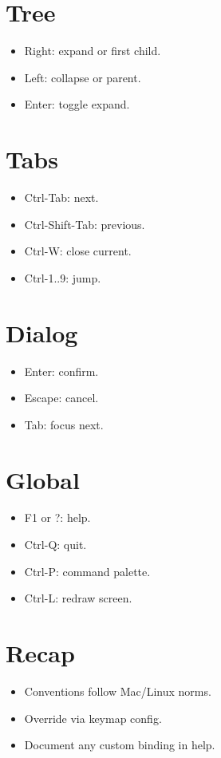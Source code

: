 \section{Tree}

\begin{itemize}[leftmargin=*]
  \item Right: expand or first child.
  \item Left: collapse or parent.
  \item Enter: toggle expand.
\end{itemize}

\section{Tabs}

\begin{itemize}[leftmargin=*]
  \item Ctrl-Tab: next.
  \item Ctrl-Shift-Tab: previous.
  \item Ctrl-W: close current.
  \item Ctrl-1..9: jump.
\end{itemize}

\section{Dialog}

\begin{itemize}[leftmargin=*]
  \item Enter: confirm.
  \item Escape: cancel.
  \item Tab: focus next.
\end{itemize}

\section{Global}

\begin{itemize}[leftmargin=*]
  \item F1 or ?: help.
  \item Ctrl-Q: quit.
  \item Ctrl-P: command palette.
  \item Ctrl-L: redraw screen.
\end{itemize}

\section{Recap}

\begin{recap}
\begin{itemize}[leftmargin=*]
  \item Conventions follow Mac/Linux norms.
  \item Override via keymap config.
  \item Document any custom binding in help.
\end{itemize}
\end{recap}
